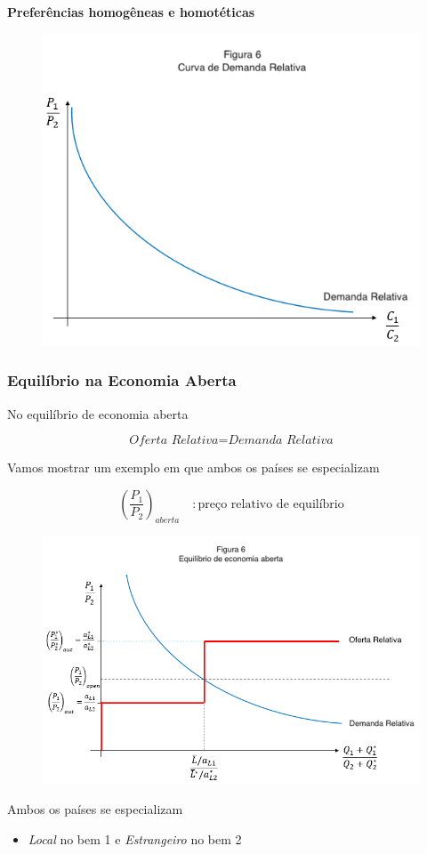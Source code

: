 \documentclass[a4paper,12pt]{article}[abntex2]
\begin{document}
\textbf{Preferências homogêneas e homotéticas}

\begin{figure}[H]
    \centering
    \includegraphics[width=0.7\linewidth]{Imagens/a8i5.png}
\end{figure}

\subsubsection{\textbf{Equilíbrio na Economia Aberta}}
No equilíbrio de economia aberta

\[
\boxed{\textit{Oferta Relativa} = \textit{Demanda Relativa}}
\]

Vamos mostrar um exemplo em que ambos os países se especializam

\[
\left( \frac{P_1}{P_2} \right)_{\textit{aberta}} \quad : \text{preço relativo de equilíbrio}
\]

\begin{figure}[H]
    \centering
    \includegraphics[width=0.7\linewidth]{Imagens/a8i6.png}
\end{figure}

Ambos os países se especializam \begin{itemize}
    \item \textit{Local} no bem 1 e \textit{Estrangeiro} no bem 2
\end{itemize}
\end{document}
